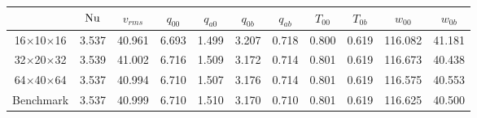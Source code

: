 \begin{tabular}{c|cccccccccc}
    & $\mathrm{Nu}$ & $v_{rms}$ & $q_{00}$ & $q_{a0}$ &  $q_{0b}$ &$q_{ab}$ & $T_{00}$ & $T_{0b}$ & $w_{00}$ & $w_{0b}$ \\
\hline
16$\times$10$\times$16 & 3.537 & 40.961 & 6.693 & 1.499 & 3.207 & 0.718 &0.800 & 0.619 &116.082 & 41.181 \\
32$\times$20$\times$32 & 3.539 & 41.002 & 6.716 & 1.509 & 3.172 & 0.714 &0.801 & 0.619 &116.673 & 40.438 \\
64$\times$40$\times$64 & 3.537 & 40.994 & 6.710 & 1.507 & 3.176 & 0.714 &0.801 & 0.619 &116.575 & 40.553 \\
\hline
Benchmark & 3.537 & 40.999 & 6.710 & 1.510 & 3.170 & 0.710 &0.801 & 0.619 &116.625 & 40.500 \\
\end{tabular}
